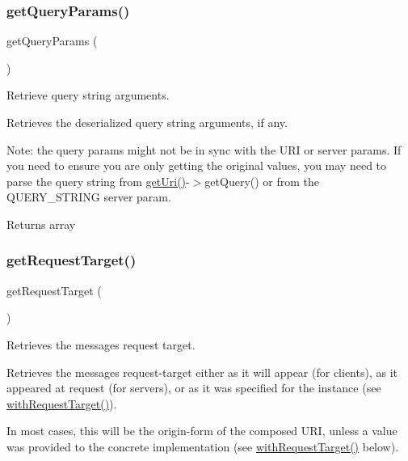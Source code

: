 \subsubsection{\texorpdfstring{get\+Query\+Params()}{getQueryParams()}}
{\footnotesize\ttfamily get\+Query\+Params (\begin{DoxyParamCaption}{ }\end{DoxyParamCaption})}

Retrieve query string arguments.

Retrieves the deserialized query string arguments, if any.

Note\+: the query params might not be in sync with the U\+RI or server params. If you need to ensure you are only getting the original values, you may need to parse the query string from {\ttfamily \mbox{\hyperlink{class_pes_1_1_http_1_1_request_a2ac86cae38fbe15a019d075d485ab702}{get\+Uri()}}-\/$>$get\+Query()} or from the {\ttfamily Q\+U\+E\+R\+Y\+\_\+\+S\+T\+R\+I\+NG} server param.

\begin{DoxyReturn}{Returns}
array 
\end{DoxyReturn}
\mbox{\label{class_pes_1_1_http_1_1_request_a042c696b418d7e63ed4d1bb549291a84}} 
\subsubsection{\texorpdfstring{get\+Request\+Target()}{getRequestTarget()}}
{\footnotesize\ttfamily get\+Request\+Target (\begin{DoxyParamCaption}{ }\end{DoxyParamCaption})}

Retrieves the message\textquotesingle{}s request target.

Retrieves the message\textquotesingle{}s request-\/target either as it will appear (for clients), as it appeared at request (for servers), or as it was specified for the instance (see \mbox{\hyperlink{class_pes_1_1_http_1_1_request_ac3ea96f04513448629aa7b03b0fb414a}{with\+Request\+Target()}}).

In most cases, this will be the origin-\/form of the composed U\+RI, unless a value was provided to the concrete implementation (see \mbox{\hyperlink{class_pes_1_1_http_1_1_request_ac3ea96f04513448629aa7b03b0fb414a}{with\+Request\+Target()}} below).

